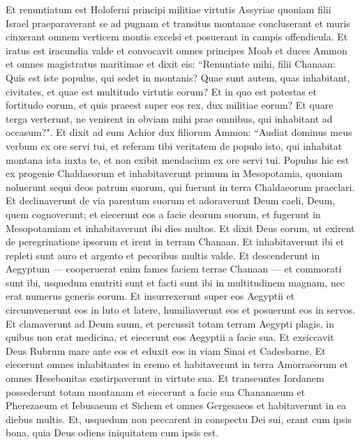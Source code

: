 \begin{biblechapter}  
\verse Et renuntiatum est Holoferni principi militiae virtutis Assyriae quoniam filii Israel praeparaverant se ad pugnam et transitus montanae concluserant et muris cinxerant omnem verticem montis excelsi et posuerant in campis offendicula. 
\verse Et iratus est iracundia valde et convocavit omnes principes Moab et duces Ammon et omnes magistratus maritimae 
\verse et dixit eis: “Renuntiate mihi, filii Chanaan: Quis est iste populus, qui sedet in montanis? Quae sunt autem, quas inhabitant, civitates, et quae est multitudo virtutis eorum? Et in quo est potestas et fortitudo eorum, et quis praeest super eos rex, dux militiae eorum? 
\verse Et quare terga verterunt, ne venirent in obviam mihi prae omnibus, qui inhabitant ad occasum?". 
\verse Et dixit ad eum Achior dux filiorum Ammon: “Audiat dominus meus verbum ex ore servi tui, et referam tibi veritatem de populo isto, qui inhabitat montana ista iuxta te, et non exibit mendacium ex ore servi tui. 
\verse Populus hic est ex progenie Chaldaeorum 
\verse et inhabitaverunt primum in Mesopotamia, quoniam noluerunt sequi deos patrum suorum, qui fuerunt in terra Chaldaeorum praeclari. 
\verse Et declinaverunt de via parentum suorum et adoraverunt Deum caeli, Deum, quem cognoverunt; et eiecerunt eos a facie deorum suorum, et fugerunt in Mesopotamiam et inhabitaverunt ibi dies multos. 
\verse Et dixit Deus eorum, ut exirent de peregrinatione ipsorum et irent in terram Chanaan. Et inhabitaverunt ibi et repleti sunt auro et argento et pecoribus multis valde. 
\verse Et descenderunt in Aegyptum — cooperuerat enim fames faciem terrae Chanaan — et commorati sunt ibi, usquedum enutriti sunt et facti sunt ibi in multitudinem magnam, nec erat numerus generis eorum. 
\verse Et insurrexerunt super eos Aegyptii et circumvenerunt eos in luto et latere, humiliaverunt eos et posuerunt eos in servos. 
\verse Et clamaverunt ad Deum suum, et percussit totam terram Aegypti plagis, in quibus non erat medicina, et eiecerunt eos Aegyptii a facie sua.  
\verse Et exsiccavit Deus Rubrum mare ante eos 
\verse et eduxit eos in viam Sinai et Cadesbarne. Et eiecerunt omnes inhabitantes in eremo 
\verse et habitaverunt in terra Amorraeorum et omnes Hesebonitas exstirpaverunt in virtute sua. Et transeuntes Iordanem possederunt totam montanam 
\verse et eiecerunt a facie sua Chananaeum et Pherezaeum et Iebusaeum et Sichem et omnes Gergesaeos et habitaverunt in ea diebus multis. 
\verse Et, usquedum non peccarent in conspectu Dei sui, erant cum ipsis bona, quia Deus odiens iniquitatem cum ipsis est.  

\end{biblechapter}
